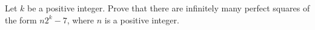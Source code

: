 Let $k$ be a positive integer. Prove that there are infinitely many perfect squares of the form $n2^k - 7$, where $n$ is a positive integer.

